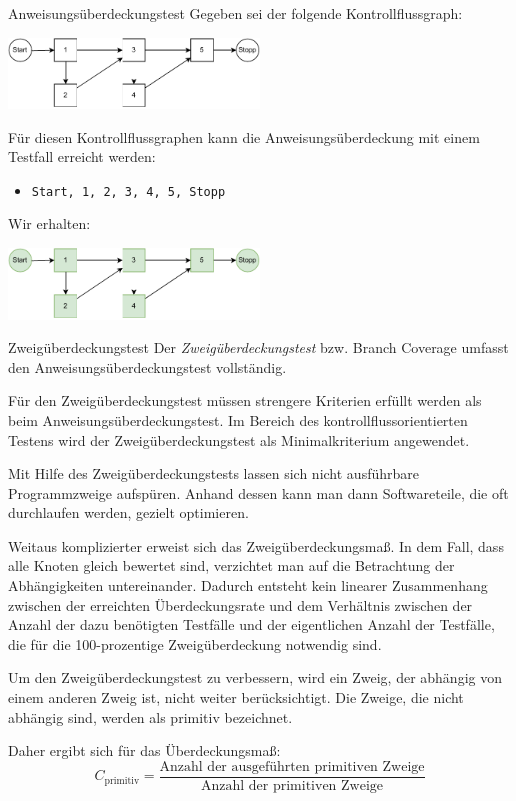 \begin{example}{Anweisungsüberdeckungstest}
    Gegeben sei der folgende Kontrollflussgraph:
    \begin{center}
        \includegraphics[width=0.5\textwidth]{includes/figures/example_kontrollfluss_base.pdf}
    \end{center}

    Für diesen Kontrollflussgraphen kann die Anweisungsüberdeckung mit einem Testfall erreicht werden:
    \begin{itemize}
        \item \texttt{Start, 1, 2, 3, 4, 5, Stopp}
    \end{itemize}

    Wir erhalten:
    \begin{center}
        \includegraphics[width=0.5\textwidth]{includes/figures/example_kontrollfluss_anweisung.pdf}
    \end{center}
\end{example}

\begin{defi}{Zweigüberdeckungstest}
    Der \emph{Zweigüberdeckungstest} bzw. Branch Coverage umfasst den Anweisungsüberdeckungstest vollständig.

    Für den Zweigüberdeckungstest  müssen strengere Kriterien erfüllt werden als beim Anweisungsüberdeckungstest.
    Im Bereich des kontrollflussorientierten Testens wird der Zweigüberdeckungstest als Minimalkriterium angewendet.

    Mit Hilfe des Zweigüberdeckungstests lassen sich nicht ausführbare Programmzweige aufspüren.
    Anhand dessen kann man dann Softwareteile, die oft durchlaufen werden, gezielt optimieren.

    Weitaus komplizierter erweist sich das Zweigüberdeckungsmaß.
    In dem Fall, dass alle Knoten gleich bewertet sind, verzichtet man auf die Betrachtung der Abhängigkeiten untereinander.
    Dadurch entsteht kein linearer Zusammenhang zwischen der erreichten Überdeckungsrate und dem Verhältnis zwischen der Anzahl der dazu benötigten Testfälle und der eigentlichen Anzahl der Testfälle, die für die 100-prozentige Zweigüberdeckung notwendig sind.

    Um den Zweigüberdeckungstest zu verbessern, wird ein Zweig, der abhängig von einem anderen Zweig ist, nicht weiter berücksichtigt.
    Die Zweige, die nicht abhängig sind, werden als primitiv bezeichnet.

    Daher ergibt sich für das Überdeckungsmaß:
    \[
        C_{\text{primitiv}} = \frac{\text{Anzahl der ausgeführten primitiven Zweige}}{\text{Anzahl der primitiven Zweige}}
    \]
\end{defi}

